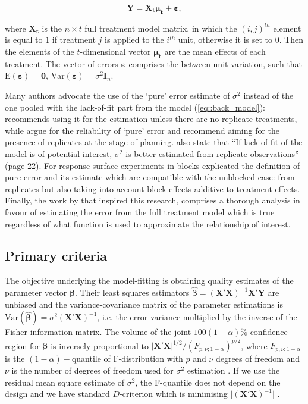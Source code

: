 \begin{equation}
\label{eq::back_trnt}
\bm{Y}=\bm{X_{t}\mu_{t}}+\bm{\varepsilon},
\end{equation} 

where $\bm{X_{t}}$ is the $n\times t$ full treatment model matrix, in which the $(i,j)^{th}$ element is equal to $1$ if treatment $j$ is applied to the $i^{th}$ unit, otherwise it is set to $0$. Then the elements of the $t$-dimensional vector $\bm{\mu_{t}}$ are the mean effects of each treatment. The vector of errors $\bm{\varepsilon}$ comprises the between-unit variation, such that $\mbox{E}(\bm{\varepsilon})=\bm{0}$, $\mbox{Var}(\bm{\varepsilon})=\sigma^2\bm{I}_{n}$.

Many authors advocate the use of the `pure' error estimate of $\sigma^2$ instead of the one pooled with the lack-of-fit part from the model (\ref{eq::back_model}): \cite{Cox1958planning} recommends using it for the estimation unless there are no replicate treatments, while \cite{Draper1998} argue for the reliability of `pure' error and recommend aiming for the presence of replicates at the stage of planning. \cite{Atkinson2007} also state that ``If lack-of-fit of the model is of potential interest, $\sigma^{2}$ is better estimated from replicate observations'' (page 22). For response surface experiments in blocks \cite{Gilmour2000PErsm} explicated the definition of pure error and its estimate which are compatible with the unblocked case: from replicates but also taking into account  block effects additive to treatment effects. Finally, the work by \cite{GilmourTrinca2012} that inspired this research, comprises a thorough analysis in favour of estimating the error from the full treatment model which is true regardless of what function is used to approximate the relationship of interest.

\subsection{Primary criteria}
\label{seq::primary_criteria}
The objective underlying the model-fitting is obtaining quality estimates of the parameter vector $\bm{\beta}$. Their least squares estimators $\hat{\bm\beta}=(\bm{X}'\bm{X})^{-1}\bm{X}'\bm{Y}$ are unbiased and the variance-covariance matrix of the parameter estimations is $\mbox{Var}(\hat{\bm\beta})=\sigma^2(\bm{X}'\bm{X})^{-1}$, i.e. the error variance multiplied by the inverse of the Fisher information matrix. 
The volume of the joint $100(1-\alpha)\%$ confidence region for $\bm{\beta}$ is inversely proportional to $\vert\bm{X}'\bm{X}\vert^{1/2} / (F_{p,\nu;1-\alpha})^{p/2}$, where $F_{p,\nu;1-\alpha}$ is the $(1-\alpha)-$quantile of F-distribution with $p$ and $\nu$ degrees of freedom and $\nu$ is the number of degrees of freedom used for $\sigma^{2}$ estimation \citep{Draper1998}. If we use the residual mean square estimate of $\sigma^{2}$, the F-quantile does not depend on the design and we have standard $D$-criterion which is minimising $\vert(\bm{X}'\bm{X})^{-1}\vert$ \citep{Atkinson2007}. 

